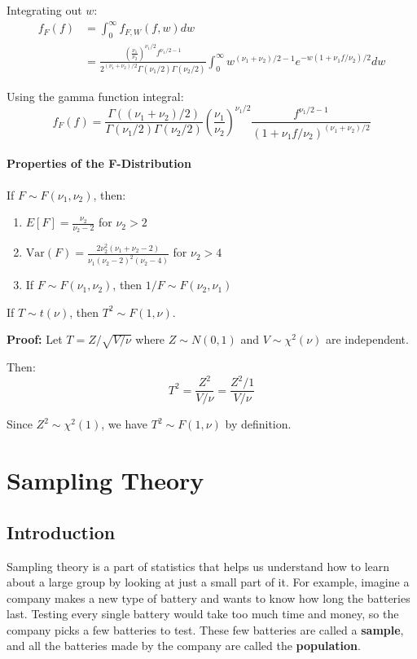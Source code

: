 \documentclass[twoside]{book}
\begin{document}
Integrating out $w$:
\begin{align*}
f_F(f) &= \int_0^{\infty} f_{F,W}(f,w) dw\\
&= \frac{\left(\frac{\nu_1}{\nu_2}\right)^{\nu_1/2} f^{\nu_1/2-1}}{2^{(\nu_1+\nu_2)/2}\Gamma(\nu_1/2)\Gamma(\nu_2/2)} \int_0^{\infty} w^{(\nu_1+\nu_2)/2-1} e^{-w(1+\nu_1 f/\nu_2)/2} dw
\end{align*}

Using the gamma function integral:
$$f_F(f) = \frac{\Gamma((\nu_1+\nu_2)/2)}{\Gamma(\nu_1/2)\Gamma(\nu_2/2)} \left(\frac{\nu_1}{\nu_2}\right)^{\nu_1/2} \frac{f^{\nu_1/2-1}}{(1+\nu_1 f/\nu_2)^{(\nu_1+\nu_2)/2}}$$


\subsubsection{Properties of the F-Distribution}

\begin{textbox}
If $F \sim F(\nu_1, \nu_2)$, then:
\begin{enumerate}
\item $E[F] = \frac{\nu_2}{\nu_2-2}$ for $\nu_2 > 2$
\item $\text{Var}(F) = \frac{2\nu_2^2(\nu_1+\nu_2-2)}{\nu_1(\nu_2-2)^2(\nu_2-4)}$ for $\nu_2 > 4$
\item If $F \sim F(\nu_1, \nu_2)$, then $1/F \sim F(\nu_2, \nu_1)$
\end{enumerate}
\end{textbox}

\begin{textbox}
If $T \sim t(\nu)$, then $T^2 \sim F(1, \nu)$.
\end{textbox}

\textbf{Proof:} Let $T = Z/\sqrt{V/\nu}$ where $Z \sim N(0,1)$ and $V \sim \chi^2(\nu)$ are independent.

Then:
$$T^2 = \frac{Z^2}{V/\nu} = \frac{Z^2/1}{V/\nu}$$

Since $Z^2 \sim \chi^2(1)$, we have $T^2 \sim F(1, \nu)$ by definition.


\chapter{Sampling Theory}
\section{Introduction}
Sampling theory is a part of statistics that helps us understand how to learn about a large group by looking at just a small part of it. For example, imagine a company makes a new type of battery and wants to know how long the batteries last. Testing every single battery would take too much time and money, so the company picks a few batteries to test. These few batteries are called a \textbf{sample}, and all the batteries made by the company are called the \textbf{population}.
\end{document}
